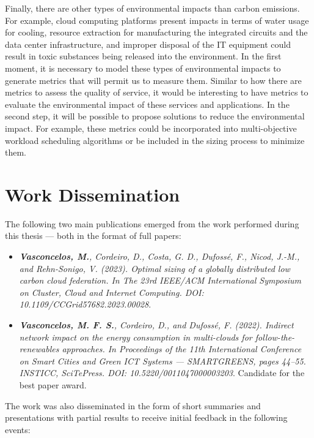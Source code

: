 Finally, there are other types of environmental impacts than carbon emissions. For example, cloud computing platforms present impacts in terms of water usage for cooling, resource extraction for manufacturing the integrated circuits and the data center infrastructure, and improper disposal of the IT equipment could result in toxic substances being released into the environment. In the first moment, it is necessary to model these types of environmental impacts to generate metrics that will permit us to measure them. Similar to how there are metrics to assess the quality of service, it would be interesting to have metrics to evaluate the environmental impact of these services and applications. In the second step, it will be possible to propose solutions to reduce the environmental impact. For example, these metrics could be incorporated into multi-objective workload scheduling algorithms or be included in the sizing process to minimize them.

\section{Work Dissemination}

\label{sec:conclusion_dissemination}

The following two main publications emerged from the work performed during this thesis --- both in the format of full papers:

\begin{itemize}

\item  \textit{\textbf{Vasconcelos, M.}, Cordeiro, D., Costa, G. D., Dufossé, F., Nicod, J.-M., and Rehn-Sonigo, V. (2023). Optimal sizing of a globally distributed low carbon cloud federation. In The 23rd IEEE/ACM International Symposium on Cluster, Cloud and Internet Computing. DOI: 10.1109/CCGrid57682.2023.00028}.
  
\item  \textit{\textbf{Vasconcelos, M. F. S.}, Cordeiro, D., and Dufossé, F. (2022). Indirect network impact on the energy consumption in multi-clouds for follow-the-renewables approaches. In Proceedings of the 11th International Conference on Smart Cities and Green ICT Systems — SMARTGREENS, pages 44–55. INSTICC, SciTePress. DOI: 10.5220/0011047000003203}. Candidate for the best paper award.

\end{itemize}

The work was also disseminated in the form of short summaries and presentations with partial results to receive initial feedback in the following events:

